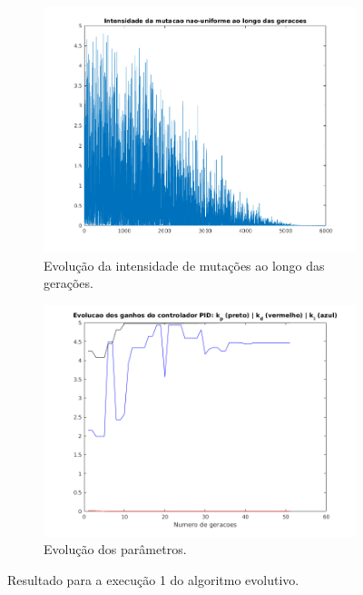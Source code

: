 \begin {enumerate}
\begin{figure}[h!]
		\begin{subfigure}{.5\textwidth}
		  \centering
		  \includegraphics[width=1\linewidth]{image/mutacao_pid_ex_c}
		  \caption{\centering Evolução da intensidade de mutações ao longo das
		  gerações.}
		  \label{fig:pid_mutacao_c}
		\end{subfigure}%
		\begin{subfigure}{.5\textwidth}
		  \centering
		  \includegraphics[width=1\linewidth]{image/kp_kd_ki_pid_ex_c}
		  \caption{\centering Evolução dos parâmetros.}
		  \label{fig:pid_parametros_c} 
		\end{subfigure}
	
	\caption{Resultado para a execução 1 do algoritmo evolutivo.}
	\end{figure}
	

\end{enumerate}

